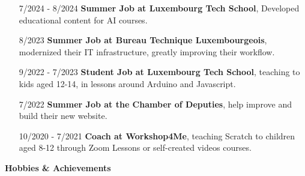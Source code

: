 \documentclass{article}
\begin{document}
\begin{minipage}[t]{0.7\textwidth}
    \begin{itemize} 
        \item [7/2024 - 8/2024] \textbf{Summer Job at Luxembourg Tech School}, Developed educational content for AI courses.
        
       	\item [8/2023] \textbf{Summer Job at Bureau Technique Luxembourgeois}, modernized their IT infrastructure, greatly improving their workflow.
        
       	\item [9/2022 - 7/2023] \textbf{Student Job at Luxembourg Tech School}, teaching to kids aged 12-14, in lessons around Arduino and Javascript.
        
    	\item [7/2022] \textbf{Summer Job at the Chamber of Deputies}, help improve and build their new website.
        
       	\item [10/2020 - 7/2021] \textbf{Coach at Workshop4Me}, teaching Scratch to children aged 8-12 through Zoom Lessons or self-created videos courses.
    \end{itemize}
\end{minipage}%

\pagebreak


\vspace{0.5cm} %
\centering %
\dotfill \textbf{\Large Hobbies \& Achievements} \dotfill
\vspace{0.5cm} %
\end{document}
